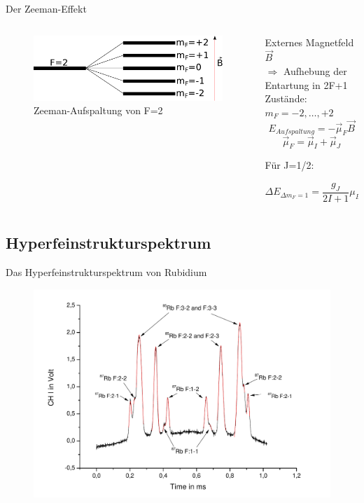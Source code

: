 \documentclass{beamer}
\begin{document}
\begin{frame}{Der Zeeman-Effekt}
\begin{columns}
\begin{column}{4.5cm}
	\begin{figure}[H]
	\centering \includegraphics[width=\textwidth]{Bilder/Zeeman.pdf}
	\caption{Zeeman-Aufspaltung von F=2}
	\end{figure}
\end{column}
\begin{column}{5.5cm}
Externes Magnetfeld $\vec B$ \\ $\Rightarrow$ Aufhebung der Entartung in 2F+1 Zustände: $m_F = -2,\dots,+2$
$$E_{Aufspaltung} = - \vec\mu_F\vec B$$ 
$$\vec\mu_F = \vec\mu_I + \vec \mu_J$$

Für J=1/2:

$$\Delta E_{\Delta m_F=1} = \frac{g_J}{2I+1}\mu_B B$$
\end{column}
\end{columns}
\end{frame}


\subsection{Hyperfeinstrukturspektrum}
\begin{frame}[plain]{Das Hyperfeinstrukturspektrum von Rubidium}
	\begin{figure}[H]
	\centering \includegraphics[width=\textwidth]{Bilder/HFS.pdf}
	\end{figure}
\end{frame}
\end{document}
